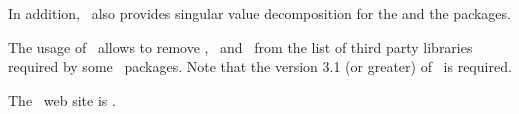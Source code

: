  In addition, \eigen\ also provides singular value decomposition for the 
 and the  packages.
 
 The usage of \eigen\ allows to remove \lapack, \blas\ and \taucs\ from the list of third party libraries
 required by some \cgal\ packages. Note that the version 3.1 (or greater) of \eigen\ is required.

 The \eigen\ web site is \eigenpage.









